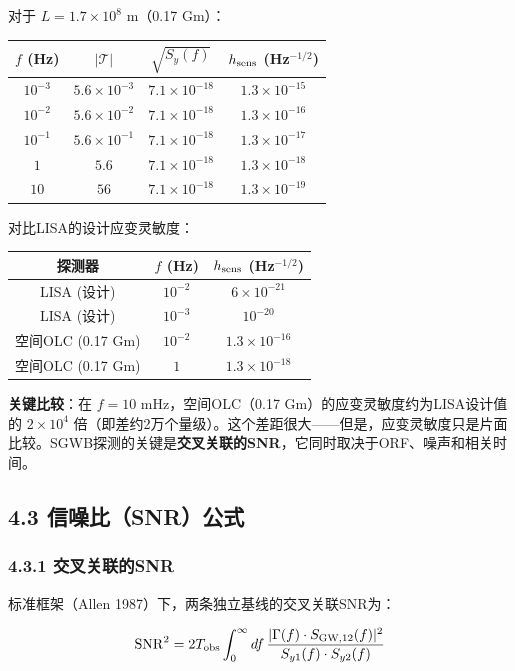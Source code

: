 \documentclass[12pt,a4paper]{article}
\begin{document}
对于 $L = 1.7 \times 10^8$ m（0.17 Gm）：

\begin{tabular}{|c|c|c|c|}
\hline
$f$ (Hz) & $|\mathcal{T}|$ & $\sqrt{S_y(f)}$ & $h_{\rm sens}$ (Hz$^{-1/2}$) \\
\hline
$10^{-3}$ & $5.6 \times 10^{-3}$ & $7.1 \times 10^{-18}$ & $1.3 \times 10^{-15}$ \\
$10^{-2}$ & $5.6 \times 10^{-2}$ & $7.1 \times 10^{-18}$ & $1.3 \times 10^{-16}$ \\
$10^{-1}$ & $5.6 \times 10^{-1}$ & $7.1 \times 10^{-18}$ & $1.3 \times 10^{-17}$ \\
$1$ & $5.6$ & $7.1 \times 10^{-18}$ & $1.3 \times 10^{-18}$ \\
$10$ & $56$ & $7.1 \times 10^{-18}$ & $1.3 \times 10^{-19}$ \\
\hline
\end{tabular}


对比LISA的设计应变灵敏度：

\begin{tabular}{|c|c|c|}
\hline
探测器 & $f$ (Hz) & $h_{\rm sens}$ (Hz$^{-1/2}$) \\
\hline
LISA (设计) & $10^{-2}$ & $6 \times 10^{-21}$ \\
LISA (设计) & $10^{-3}$ & $10^{-20}$ \\
空间OLC (0.17 Gm) & $10^{-2}$ & $1.3 \times 10^{-16}$ \\
空间OLC (0.17 Gm) & $1$ & $1.3 \times 10^{-18}$ \\
\hline
\end{tabular}


\textbf{关键比较}：在 $f = 10$ mHz，空间OLC（0.17 Gm）的应变灵敏度约为LISA设计值的 $2 \times 10^4$ 倍（即差约2万个量级）。这个差距很大——但是，应变灵敏度只是片面比较。SGWB探测的关键是\textbf{交叉关联的SNR}，它同时取决于ORF、噪声和相关时间。

\subsection{4.3 信噪比（SNR）公式}


\subsubsection{4.3.1 交叉关联的SNR}


标准框架（Allen 1987）下，两条独立基线的交叉关联SNR为：

$${\rm SNR}^2 = 2 T_{\rm obs} \int_0^\infty df\, \frac{|\Gamma(f) \cdot S_{{\rm GW},12}(f)|^2}{S_{y1}(f) \cdot S_{y2}(f)}$$
\end{document}
